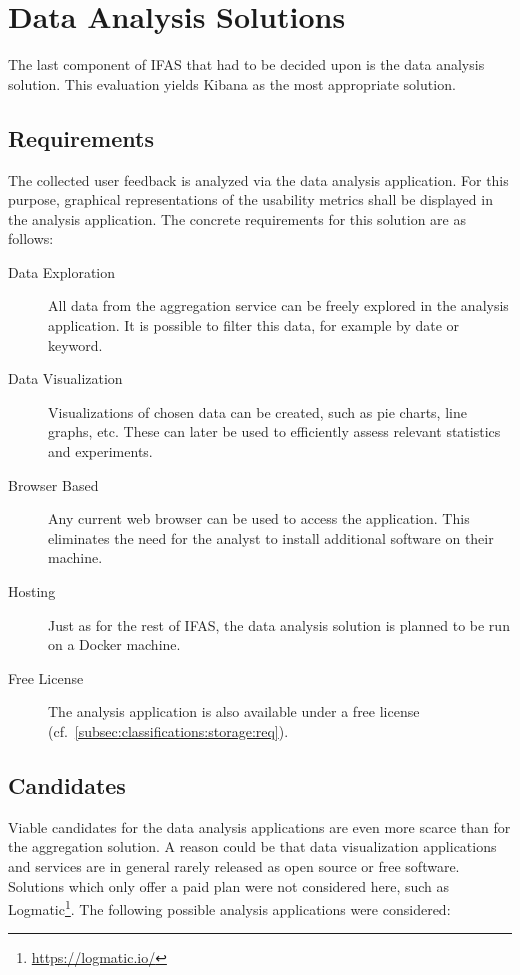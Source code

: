 \section{Data Analysis Solutions}
\label{sec:classifications:analysis}

The last component of \ac{IFAS} that had to be decided upon is the data analysis solution.
This evaluation yields Kibana as the most appropriate solution.

\subsection{Requirements}

The collected user feedback is analyzed via the data analysis application.
For this purpose, graphical representations of the usability metrics shall be displayed in the analysis application.
The concrete requirements for this solution are as follows:

\begin{description}
\item[Data Exploration] All data from the aggregation service can be freely explored in the analysis application.
It is possible to filter this data, for example by date or keyword.
\item[Data Visualization] Visualizations of chosen data can be created, such as pie charts, line graphs, etc.
These can later be used to efficiently assess relevant statistics and experiments.
\item[Browser Based] Any current web browser can be used to access the application.
This eliminates the need for the analyst to install additional software on their machine.
\item [Hosting] Just as for the rest of \ac{IFAS}, the data analysis solution is planned to be run on a Docker machine.
\item[Free License] The analysis application is also available under a free license (cf.~\cref{subsec:classifications:storage:req}).
\end{description}

\subsection{Candidates}

Viable candidates for the data analysis applications are even more scarce than for the aggregation solution.
A reason could be that data visualization applications and services are in general rarely released as open source or free software.
Solutions which only offer a paid plan were not considered here, such as Logmatic\footnote{\url{https://logmatic.io/}}.
The following possible analysis applications were considered:

